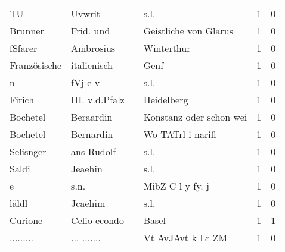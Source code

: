 \begin{center}
\begin{tiny}
\begin{longtabu}{llllrr}
                       TU &                             Uvwrit &             &                                        s.l. &          1 &         0 \\
                  Brunner &                          Frid. und &             &                       Geistliche von Glarus &          1 &         0 \\
                  fSfarer &                          Ambrosius &             &                                  Winterthur &          1 &         0 \\
             Französische &                        italienisch &             &                                        Genf &          1 &         0 \\
                        n &                            fVj e v &             &                                        s.l. &          1 &         0 \\
                   Firich &                     III. v.d.Pfalz &             &                                  Heidelberg &          1 &         0 \\
                 Bochetel &                          Beraardin &             &                     Konstanz oder schon wei &          1 &         0 \\
                 Bochetel &                          Bernardin &             &                           Wo TATrl i narifl &          1 &         0 \\
                Selisnger &                         ans Rudolf &             &                                        s.l. &          1 &         0 \\
                    Saldi &                            Jeaehin &             &                                        s.l. &          1 &         0 \\
                        e &                               s.n. &             &                            MibZ C l y fy. j &          1 &         0 \\
                    läldl &                            Jcaehim &             &                                        s.l. &          1 &         0 \\
                  Curione &                       Celio econdo &             &                                       Basel &          1 &         1 \\
                ......... &                        ... ....... &             &                           Vt AvJAvt k Lr ZM &          1 &         0 \\

\end{longtabu}
\end{tiny}
\end{center}
